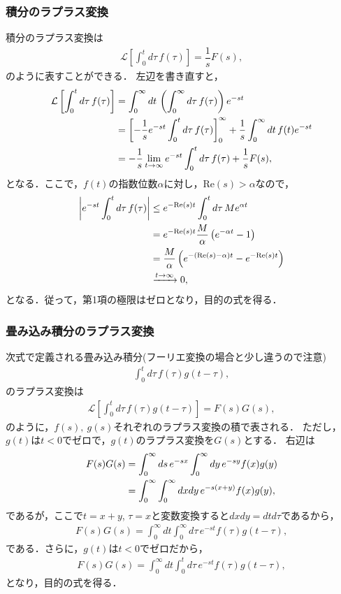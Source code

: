 \subsubsection{積分のラプラス変換}
%
積分のラプラス変換は
\begin{align}
  \mathcal{L}\left[\int_{0}^{t}d\tau\,f(\tau)\right] = \dfrac{1}{s}F(s),
\end{align}
のように表すことができる．
左辺を書き直すと，
\begin{align}
 \mathcal{L}\left[\int_{0}^{t}d\tau\, f(\tau)\right]
 &=\int_{0}^{\infty}dt\,\left(\int_{0}^{\infty}d\tau\,f(\tau)\right)e^{-st} \notag \\
 &=\left[-\dfrac{1}{s}e^{-st}\int_{0}^{t}d\tau\,f(\tau)\right]_{0}^{\infty} 
   +\dfrac{1}{s}\int_{0}^{\infty}dt\,f(t)e^{-st} \notag \\
 &=-\dfrac{1}{s}\lim_{t\to\infty}e^{-st}\int_{0}^{t}d\tau\,f(\tau) + \dfrac{1}{s}F(s), 
\end{align}
となる．ここで，$f(t)$の指数位数$\alpha$に対し，$\mathrm{Re}(s) > \alpha$なので，
\begin{align}
 \left|e^{-st}\int_{0}^{t}d\tau\, f(\tau)\right| 
 & \leq e^{-\mathrm{Re}(s)t}\int_{0}^{t}d\tau\, Me^{\alpha t} \notag \\
 & = e^{-\mathrm{Re}(s)t}\dfrac{M}{\alpha}\left(e^{-\alpha t}-1\right) \notag \\
 & = \dfrac{M}{\alpha}\left(e^{-(\mathrm{Re}(s)-\alpha)t}-e^{-\mathrm{Re}(s)t}\right) \notag \\
 & \xrightarrow{t\to \infty} 0,
\end{align}
となる．従って，第1項の極限はゼロとなり，目的の式を得る．
%
\subsubsection{畳み込み積分のラプラス変換}
%
次式で定義される畳み込み積分(フーリエ変換の場合と少し違うので注意)
\begin{align}
 \int_{0}^{t}d\tau\, f(\tau)g(t-\tau), 
\end{align}
のラプラス変換は
\begin{align}
 \mathcal{L}\left[\int_{0}^{t}d\tau\,f(\tau)g(t-\tau)\right] = F(s)G(s), 
\end{align}
のように，$f(s),~g(s)$それぞれのラプラス変換の積で表される．
ただし，$g(t)$は$t<0$でゼロで，$g(t)$のラプラス変換を$G(s)$とする．
右辺は
\begin{align}
 F(s)G(s) 
 &= \int_{0}^{\infty}ds\,e^{-sx}\int_{0}^{\infty}dy\, e^{-sy}f(x)g(y) \notag \\
 &= \int_{0}^{\infty}\int_{0}^{\infty}dxdy\,e^{-s(x+y)}f(x)g(y),
\end{align}
であるが，ここで$t=x+y$, $\tau=x$と変数変換すると$dxdy = dtd\tau$であるから，
\begin{align}
 F(s)G(s) = \int_{0}^{\infty}dt\int_{0}^{\infty}d\tau\,e^{-st}f(\tau)g(t-\tau), 
\end{align}
である．さらに，$g(t)$は$t<0$でゼロだから，
\begin{align}
 F(s)G(s) = \int_{0}^{\infty}dt\int_{0}^{t}d\tau\, e^{-st}f(\tau)g(t-\tau), 
\end{align}
となり，目的の式を得る．
%
